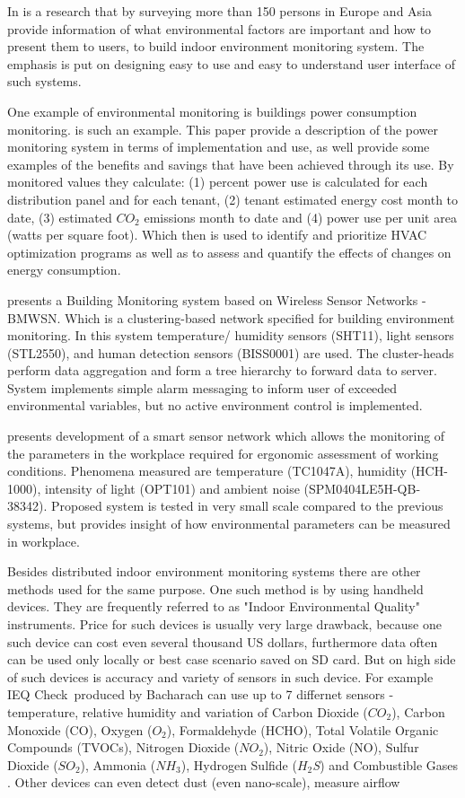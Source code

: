 \documentclass[journal]{IEEEtran}
\begin{document}
In \cite{szucheng} is a research that by surveying more than 150 persons in Europe and Asia provide information of what environmental factors are important and how to present them to users, to build indoor environment monitoring system. The emphasis is put on designing easy to use and easy to understand user interface of such systems.

One example of environmental monitoring is buildings power consumption monitoring. \cite{bldg} is such an example. This paper provide a description of the power monitoring system in terms of implementation and use, as well provide some examples of the benefits and savings that have been achieved through its use. By monitored values they calculate: (1) percent power use is calculated for each distribution panel and for each tenant, (2) tenant estimated energy cost month to date, (3) estimated $CO_2$ emissions month to date and (4) power use per unit area (watts per square foot). Which then is used to identify and prioritize HVAC optimization programs as well as to assess and quantify the effects of changes on energy consumption.

{\cite{bldg}} presents a Building Monitoring system based on Wireless Sensor Networks - BMWSN. Which is a clustering-based network specified for building environment monitoring. In this system temperature/ humidity sensors (SHT11), light sensors (STL2550), and human detection sensors
(BISS0001) are used. The cluster-heads perform data aggregation and form a tree hierarchy to forward data to server. System implements simple alarm messaging to inform user of exceeded environmental variables, but no active environment control is implemented.

\cite{qifen} presents development of a smart sensor network which allows the monitoring of the parameters in the workplace required for ergonomic assessment of working conditions. Phenomena measured are temperature (TC1047A), humidity (HCH-1000), intensity of light (OPT101) and ambient noise (SPM0404LE5H-QB-38342). Proposed system is tested in very small scale compared to the previous systems, but provides insight of how environmental parameters can be measured in workplace.

Besides distributed indoor environment monitoring systems there are other methods used for the same purpose. One such method is by using handheld devices. They are frequently referred to as "Indoor Environmental Quality" instruments. Price for such devices is usually very large drawback, because one such device can cost even several thousand US dollars, furthermore data often can be used only locally or best case scenario saved on SD card. But on high side of such devices is accuracy and variety of sensors in such device. For example IEQ Check\texttrademark\ produced  by Bacharach can use up to 7 differnet sensors - temperature, relative humidity and variation of Carbon Dioxide ($CO_2$), Carbon Monoxide (CO), Oxygen ($O_2$), Formaldehyde (HCHO), Total Volatile Organic Compounds (TVOCs), Nitrogen Dioxide ($NO_2$), Nitric Oxide (NO), Sulfur Dioxide ($SO_2$), Ammonia ($NH_3$), Hydrogen Sulfide ($H_2${\it S}) and Combustible Gases \cite{Teodora}. Other devices can even detect dust (even nano-scale), measure airflow \cite{IEQ}
\end{document}
